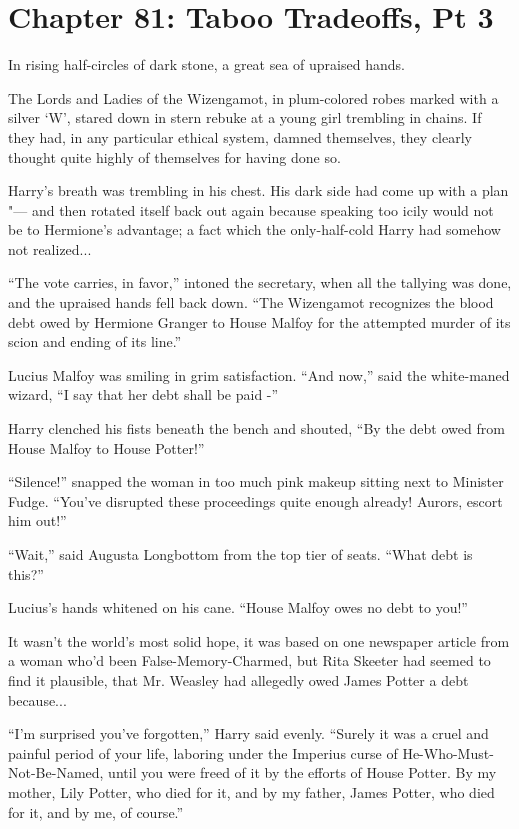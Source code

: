 \chapter{Chapter 81: Taboo Tradeoffs, Pt 3}
In rising half-circles of dark stone, a great sea of upraised hands.

The Lords and Ladies of the Wizengamot, in plum-colored robes marked
with a silver `W', stared down in stern rebuke at a young girl trembling
in chains. If they had, in any particular ethical system, damned
themselves, they clearly thought quite highly of themselves for having
done so.

Harry's breath was trembling in his chest. His dark side had come up
with a plan "--- and then rotated itself back out again because speaking
too icily would not be to Hermione's advantage; a fact which the
only-half-cold Harry had somehow not realized...

``The vote carries, in favor,'' intoned the secretary, when all the
tallying was done, and the upraised hands fell back down. ``The
Wizengamot recognizes the blood debt owed by Hermione Granger to House
Malfoy for the attempted murder of its scion and ending of its line.''

Lucius Malfoy was smiling in grim satisfaction. ``And now,'' said the
white-maned wizard, ``I say that her debt shall be paid -''

Harry clenched his fists beneath the bench and shouted, ``By the debt
owed from House Malfoy to House Potter!''

``Silence!'' snapped the woman in too much pink makeup sitting next to
Minister Fudge. ``You've disrupted these proceedings quite enough
already! Aurors, escort him out!''

``Wait,'' said Augusta Longbottom from the top tier of seats. ``What
debt is this?''

Lucius's hands whitened on his cane. ``House Malfoy owes no debt to
you!''

It wasn't the world's most solid hope, it was based on one newspaper
article from a woman who'd been False-Memory-Charmed, but Rita Skeeter
had seemed to find it plausible, that Mr. Weasley had allegedly owed
James Potter a debt because...

``I'm surprised you've forgotten,'' Harry said evenly. ``Surely it was a
cruel and painful period of your life, laboring under the Imperius curse
of He-Who-Must-Not-Be-Named, until you were freed of it by the efforts
of House Potter. By my mother, Lily Potter, who died for it, and by my
father, James Potter, who died for it, and by me, of course.''

